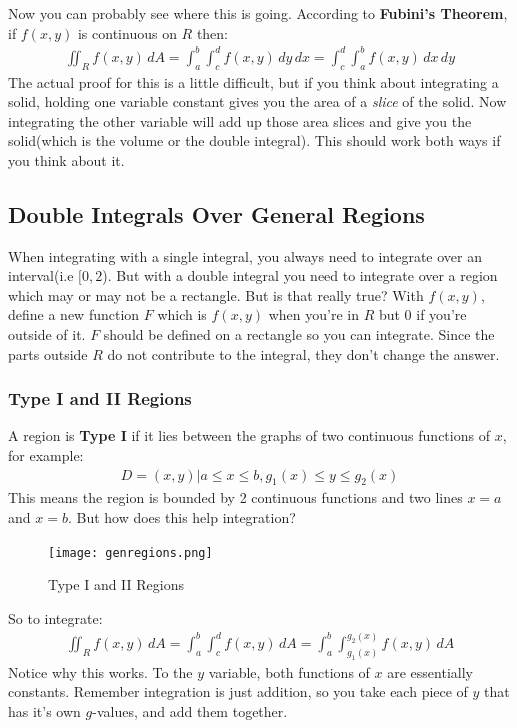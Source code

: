 \documentclass{article}
\begin{document}
Now you can probably see where this is going. According to \textbf{Fubini's Theorem}, if $f(x,y)$ is continuous on $R$ then:
\begin{gather*}
    \iint_R f(x,y) \,dA = \int_a^b \int_c^d f(x,y) \,dy\,dx = \int_c^d \int_a^b f(x,y) \,dx\,dy
\end{gather*}
The actual proof for this is a little difficult, but if you think about integrating a solid, holding one variable constant gives you the area of a \textit{slice} of the solid. Now integrating the other variable will add up those area slices and give you the solid(which is the volume or the double integral). This should work both ways if you think about it.
\subsection{Double Integrals Over General Regions}
When integrating with a single integral, you always need to integrate over an interval(i.e $[0,2$). But with a double integral you need to integrate over a region which may or may not be a rectangle. But is that really true? With $f(x,y)$, define a new function $F$ which is $f(x,y)$ when you're in $R$ but $0$ if you're outside of it. $F$ should be defined on a rectangle so you can integrate. Since the parts outside $R$ do not contribute to the integral, they don't change the answer.
\subsubsection{Type I and II Regions}
A region is \textbf{Type I} if it lies between the graphs of two continuous functions of $x$, for example:
\begin{gather*}
    D = {(x,y) | a \leqslant x \leqslant b, g_1(x) \leqslant y \leqslant g_2(x)}
\end{gather*}
This means the region is bounded by 2 continuous functions and two lines $x=a$ and $x=b$. But how does this help integration?
\begin{figure}[H]
\begin{center}
\texttt{[image: genregions.png]}
\caption{Type I and II Regions}
\label{genregions}
\end{center}
\end{figure}
So to integrate:
\begin{gather*}
    \iint_R f(x,y) \,dA = \int_a^b\int_c^d f(x,y) \,dA = \int_a^b\int_{g_1(x)}^{g_2(x)} f(x,y) \,dA
\end{gather*}
Notice why this works. To the $y$ variable, both functions of $x$ are essentially constants. Remember integration is just addition, so you take each piece of $y$ that has it's own $g$-values, and add them together.
\end{document}
